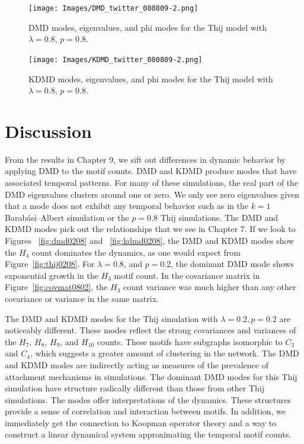 \begin{figure}
    \texttt{[image: Images/DMD\_twitter\_080809-2.png]}
    \centering
    \caption{DMD modes, eigenvalues, and phi modes for the Thij model
    with $\lambda=0.8$, $p=0.8$.}
    \label{fig:dmd0808}
\end{figure}


\begin{figure}
    \texttt{[image: Images/KDMD\_twitter\_080809-2.png]}
    \centering
    \caption{KDMD modes, eigenvalues, and phi modes for the Thij model
    with $\lambda=0.8$, $p=0.8$.}
    \label{fig:kdmd0808}
\end{figure}

\FloatBarrier

\chapter{Discussion}

From the results in Chapter 9, we sift out differences in dynamic behavior by applying
 DMD to the motif counts. DMD and KDMD produce modes that have associated temporal
patterns. For many of these simulations, the real part of
 the DMD eigenvalues clusters around one or zero. We only see zero eigenvalues
given that a mode does not exhibit any temporal behavior such as in the $k=1$ Barabási–Albert 
simulation or the $p=0.8$ Thij simulations. The DMD and KDMD modes pick out the relationships that 
we see in Chapter 7. If we look to 
Figures ~\ref{fig:dmd0208} and ~\ref{fig:kdmd0208}, the DMD and KDMD modes show the $H_{4}$ count dominates the
dynamics, as one would expect from Figure~\ref{fig:thij0208}.
For $\lambda=0.8$, and $p=0.2$, the dominant DMD mode shows exponential growth in the $H_{3}$ motif count. 
In the covariance matrix in Figure~\ref{fig:covmat0802}, the $H_{3}$ count variance was much higher than any other covariance or variance 
in the same matrix.

The DMD and KDMD modes for the Thij simulation with $\lambda=0.2, p=0.2$ are noticeably different. These modes reflect
the strong covariances and variances of the $H_{7}$, $H_{8}$, $H_{9}$, and $H_{10}$ counts. These motifs
have subgraphs isomorphic to $C_3$ and $C_4$, which suggests a greater amount of clustering in the network.
 The DMD and KDMD modes are indirectly acting as measures of 
the prevalence of attachment mechanisms in simulations. The dominant DMD modes for this Thij simulation 
have structure radically different than those from other Thij simulations. The modes offer interpretations of the dynamics.
These structures provide a sense of correlation
and interaction between motifs. In addition, we immediately get the connection to Koopman operator theory and 
 a way to construct a linear dynamical system approximating the temporal motif counts.

